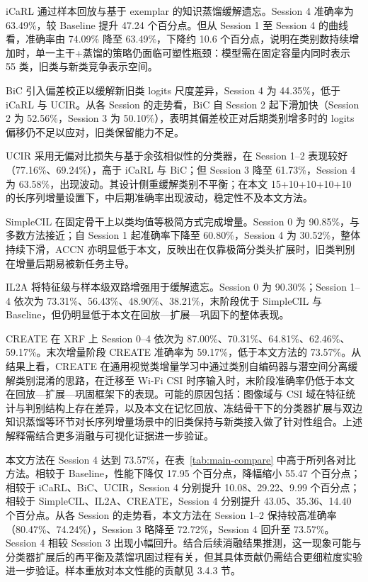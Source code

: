 iCaRL 通过样本回放与基于 exemplar 的知识蒸馏缓解遗忘。Session 4 准确率为 63.49\%，较 Baseline 提升 47.24 个百分点。但从 Session 1 至 Session 4 的曲线看，准确率由 74.09\% 降至 63.49\%，下降约 10.6 个百分点，说明在类别数持续增加时，单一主干+蒸馏的策略仍面临可塑性瓶颈：模型需在固定容量内同时表示 55 类，旧类与新类竞争表示空间。

BiC 引入偏差校正以缓解新旧类 logits 尺度差异，Session 4 为 44.35\%，低于 iCaRL 与 UCIR。从各 Session 的走势看，BiC 自 Session 2 起下滑加快（Session 2 为 52.56\%，Session 3 为 50.10\%），表明其偏差校正对后期类别增多时的 logits 偏移仍不足以应对，旧类保留能力不足。

UCIR 采用无偏对比损失与基于余弦相似性的分类器，在 Session 1–2 表现较好（77.16\%、69.24\%），高于 iCaRL 与 BiC；但 Session 3 降至 61.73\%，Session 4 为 63.58\%，出现波动。其设计侧重缓解类别不平衡；在本文 15+10+10+10+10 的长序列增量设置下，中后期准确率出现波动，稳定性不及本文方法。

SimpleCIL\cite{zhou2025revisiting} 在固定骨干上以类均值等极简方式完成增量。Session 0 为 90.85\%，与多数方法接近；自 Session 1 起准确率下降至 60.80\%，Session 4 为 30.52\%，整体持续下滑，ACCN 亦明显低于本文，反映出在仅靠极简分类头扩展时，旧类判别在增量后期易被新任务主导。

IL2A\cite{zhu2021il2a} 将特征级与样本级双路增强用于缓解遗忘。Session 0 为 90.30\%；Session 1--4 依次为 73.31\%、56.43\%、48.90\%、38.21\%，末阶段优于 SimpleCIL 与 Baseline，但仍明显低于本文在回放—扩展—巩固下的整体表现。

CREATE\cite{chen2025create} 在 XRF 上 Session 0--4 依次为 87.00\%、70.31\%、64.81\%、62.46\%、59.17\%。末次增量阶段 CREATE 准确率为 59.17\%，低于本文方法的 73.57\%。从结果上看，CREATE 在通用视觉类增量学习中通过类别自编码器与潜空间分离缓解类别混淆的思路，在迁移至 Wi-Fi CSI 时序输入时，末阶段准确率仍低于本文在回放—扩展—巩固框架下的表现。可能的原因包括：图像域与 CSI 域在特征统计与判别结构上存在差异，以及本文在记忆回放、冻结骨干下的分类器扩展与双边知识蒸馏等环节对长序列增量场景中的旧类保持与新类接入做了针对性组合。上述解释需结合更多消融与可视化证据进一步验证。

本文方法在 Session 4 达到 73.57\%，在表~\ref{tab:main-compare} 中高于所列各对比方法。相较于 Baseline，性能下降仅 17.95 个百分点，降幅缩小 55.47 个百分点；相较于 iCaRL、BiC、UCIR，Session 4 分别提升 10.08、29.22、9.99 个百分点；相较于 SimpleCIL、IL2A、CREATE，Session 4 分别提升 43.05、35.36、14.40 个百分点。从各 Session 的走势看，本文方法在 Session 1--2 保持较高准确率（80.47\%、74.24\%），Session 3 略降至 72.72\%，Session 4 回升至 73.57\%。Session 4 相较 Session 3 出现小幅回升。结合后续消融结果推测，这一现象可能与分类器扩展后的再平衡及蒸馏巩固过程有关，但其具体贡献仍需结合更细粒度实验进一步验证。样本重放对本文性能的贡献见 3.4.3 节。

